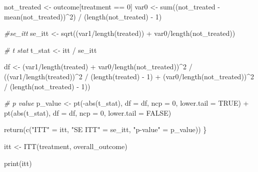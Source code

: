 \documentclass[
]{article}
\newenvironment{Shaded}{\begin{snugshade}}{\end{snugshade}}
\newcommand{\AttributeTok}[1]{\textcolor[rgb]{0.77,0.63,0.00}{#1}}
\newcommand{\CommentTok}[1]{\textcolor[rgb]{0.56,0.35,0.01}{\textit{#1}}}
\newcommand{\ConstantTok}[1]{\textcolor[rgb]{0.00,0.00,0.00}{#1}}
\newcommand{\DecValTok}[1]{\textcolor[rgb]{0.00,0.00,0.81}{#1}}
\newcommand{\FunctionTok}[1]{\textcolor[rgb]{0.00,0.00,0.00}{#1}}
\newcommand{\NormalTok}[1]{#1}
\newcommand{\OtherTok}[1]{\textcolor[rgb]{0.56,0.35,0.01}{#1}}
\newcommand{\SpecialCharTok}[1]{\textcolor[rgb]{0.00,0.00,0.00}{#1}}
\newcommand{\StringTok}[1]{\textcolor[rgb]{0.31,0.60,0.02}{#1}}
\begin{document}
\begin{Shaded}
\begin{Highlighting}[]
\NormalTok{  not\_treated }\OtherTok{\textless{}{-}}\NormalTok{ outcome[treatment }\SpecialCharTok{==} \DecValTok{0}\NormalTok{]}
\NormalTok{  var0 }\OtherTok{\textless{}{-}} \FunctionTok{sum}\NormalTok{((not\_treated }\SpecialCharTok{{-}} \FunctionTok{mean}\NormalTok{(not\_treated))}\SpecialCharTok{\^{}}\DecValTok{2}\NormalTok{) }\SpecialCharTok{/}\NormalTok{ (}\FunctionTok{length}\NormalTok{(not\_treated) }\SpecialCharTok{{-}} \DecValTok{1}\NormalTok{)}
  
  \CommentTok{\#se\_itt}
\NormalTok{  se\_itt }\OtherTok{\textless{}{-}} \FunctionTok{sqrt}\NormalTok{((var1}\SpecialCharTok{/}\FunctionTok{length}\NormalTok{(treated)) }\SpecialCharTok{+}\NormalTok{ var0}\SpecialCharTok{/}\FunctionTok{length}\NormalTok{(not\_treated))}
  
  \CommentTok{\# t stat}
\NormalTok{  t\_stat }\OtherTok{\textless{}{-}}\NormalTok{ itt }\SpecialCharTok{/}\NormalTok{ se\_itt}
  
\NormalTok{  df }\OtherTok{\textless{}{-}}\NormalTok{ (var1}\SpecialCharTok{/}\FunctionTok{length}\NormalTok{(treated) }\SpecialCharTok{+}\NormalTok{ var0}\SpecialCharTok{/}\FunctionTok{length}\NormalTok{(not\_treated))}\SpecialCharTok{\^{}}\DecValTok{2} \SpecialCharTok{/}
\NormalTok{((var1}\SpecialCharTok{/}\FunctionTok{length}\NormalTok{(treated))}\SpecialCharTok{\^{}}\DecValTok{2} \SpecialCharTok{/}\NormalTok{ (}\FunctionTok{length}\NormalTok{(treated) }\SpecialCharTok{{-}} \DecValTok{1}\NormalTok{) }\SpecialCharTok{+}
\NormalTok{(var0}\SpecialCharTok{/}\FunctionTok{length}\NormalTok{(not\_treated))}\SpecialCharTok{\^{}}\DecValTok{2} \SpecialCharTok{/}\NormalTok{ (}\FunctionTok{length}\NormalTok{(not\_treated) }\SpecialCharTok{{-}} \DecValTok{1}\NormalTok{))}
  
  \CommentTok{\# p value}
\NormalTok{  p\_value }\OtherTok{\textless{}{-}} \FunctionTok{pt}\NormalTok{(}\SpecialCharTok{{-}}\FunctionTok{abs}\NormalTok{(t\_stat), }\AttributeTok{df =}\NormalTok{ df, }\AttributeTok{ncp =} \DecValTok{0}\NormalTok{, }\AttributeTok{lower.tail =} \ConstantTok{TRUE}\NormalTok{) }\SpecialCharTok{+} 
    \FunctionTok{pt}\NormalTok{(}\FunctionTok{abs}\NormalTok{(t\_stat), }\AttributeTok{df =}\NormalTok{ df, }\AttributeTok{ncp =} \DecValTok{0}\NormalTok{, }\AttributeTok{lower.tail =} \ConstantTok{FALSE}\NormalTok{)}
  
  \FunctionTok{return}\NormalTok{(}\FunctionTok{c}\NormalTok{(}\StringTok{"ITT"} \OtherTok{=}\NormalTok{ itt, }\StringTok{"SE ITT"} \OtherTok{=}\NormalTok{ se\_itt, }\StringTok{"p{-}value"} \OtherTok{=}\NormalTok{ p\_value))}
\NormalTok{\}}

\NormalTok{itt }\OtherTok{\textless{}{-}} \FunctionTok{ITT}\NormalTok{(treatment, overall\_outcome)}

\FunctionTok{print}\NormalTok{(itt)}
\end{Highlighting}
\end{Shaded}
\end{document}
